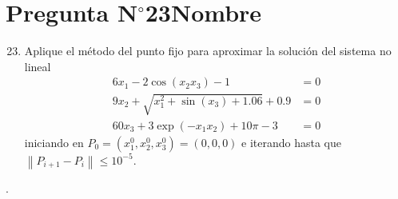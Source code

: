 \section{Pregunta N$^{\circ}$23\qquad Nombre}

\begin{frame}
	\begin{enumerate}\setcounter{enumi}{22}
		\item

		      Aplique el método del punto fijo para aproximar la solución
		      del sistema no lineal
		      \begin{align*}
			      6x_{1}-2\cos\left(x_{2}x_{3}\right)-1                   & =0 \\
			      9x_{2}+\sqrt{x^{2}_{1}+\sin\left(x_{3}\right)+1.06}+0.9 & =0 \\
			      60x_{3}+3\exp\left(-x_{1}x_{2}\right)+10 \pi-3          & =0
		      \end{align*}
		      iniciando en
		      \begin{math}
			      P_{0}=
			      \left(
			      x^{0}_{1},x^{0}_{2},x^{0}_{3}
			      \right)=
			      \left(
			      0,0,0
			      \right)
		      \end{math}
		      e iterando hasta que
		      \begin{math}
			      \left\|
			      P_{i+1}-
			      P_{i}\right\|
			      \leq 10^{-5}
		      \end{math}.
	\end{enumerate}

	\begin{solution}
		.
	\end{solution}
\end{frame}